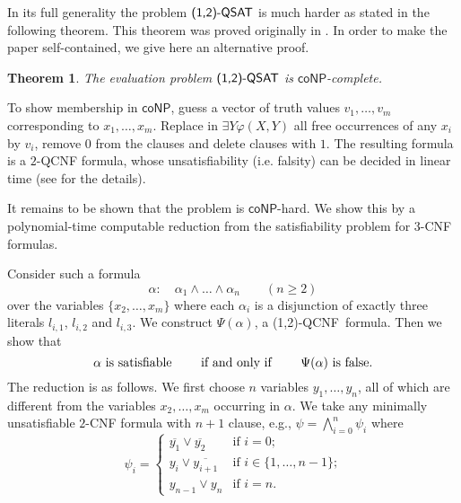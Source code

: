 \documentclass[aop,noinfoline]{imsart}
\newtheorem{theorem}{Theorem}[section]
\renewcommand{\Box}{{\vrule width0.6ex height1em depth0cm}}
\newenvironment{proof}{\noindent{\bf Proof:}}{\hfill \Box}
\newcommand{\onetwo}{(1,2)}
\newcommand{\onetwoqsat}{\mbox{\sf (1,2)-QSAT}}
\newcommand{\negate}[1]{\overline{#1}}
\newcommand{\onetwoqcnf}{\mbox{\sf \onetwo-QCNF}}
\newcommand{\coNP}{\mathsf{coNP}}
\begin{document}
In its full generality the problem $\onetwoqsat$ is much harder as stated in the
following theorem. This theorem
was proved originally   in \cite{FloegelKKB-90}. In
order to make the paper self-contained,  we give here an
alternative proof.




 \begin{theorem} {\rm \cite{FloegelKKB-90}}\label{thm:complexity}
    The  evaluation problem $\onetwoqsat$ is $\coNP$-complete.
 \end{theorem}
 
\begin{proof}
To show membership in $\coNP$, guess a vector of truth values $v_1
,\ldots , v_m$ corresponding to $x_1,\ldots , x_m$. Replace in
$\exists Y \varphi(X,Y)$ all free occurrences of any $x_i$ by
$v_i$, remove $0$ from the clauses and delete clauses with
$1$. The resulting formula is a $2$-QCNF formula, whose
unsatisfiability (i.e. falsity) can be decided in linear time
(see \cite{AspvallPT-79} for the details).
\medskip



\noindent It remains to be shown that the problem is $\coNP$-hard.
We show this by a polynomial-time computable reduction from the
satisfiability problem for 3-CNF formulas.

Consider such a formula
$$
\alpha \colon \quad \alpha_1 \land \ldots \land  \alpha_n \quad
\quad (n\geq 2)
$$
over the variables  $\{x_2, \ldots , x_m\}$ where each $\alpha_i$ is a
disjunction of exactly three literals $l_{i,1}$, $l_{i,2}$ and
$l_{i,3}$. We construct   $\Psi(\alpha)$,   a
\onetwoqcnf\ formula.
Then we show that
\begin{equation}
  \label{eq:sat-iff-false}
  \text{$\alpha$ is satisfiable \quad\quad if and only if \quad\quad
        $\Psi(\alpha)$ is false.}
\end{equation}
The reduction is as follows. We first choose $n$ variables $y_1,
\ldots , y_n$, all of which are different from the variables $x_2,
\ldots , x_m$ occurring in $\alpha$. We take any minimally
unsatisfiable $2$-CNF formula with $n+1$ clause, e.g.,
$\psi=\bigwedge_{i=0}^n \psi_i$ where
$$
\psi_i =
  \begin{cases}
  \negate{y_1} \lor \negate{y_2}     &
  \text{if $i=0$;} \\
  y_i \lor \negate{y_{i+1}} &
  \text{if $i\in \{1, \ldots , n-1\}$;} \\
  y_{n-1} \lor y_n &
  \text{if $i=n$}.
  \end{cases}
$$




\end{proof}
\end{document}
